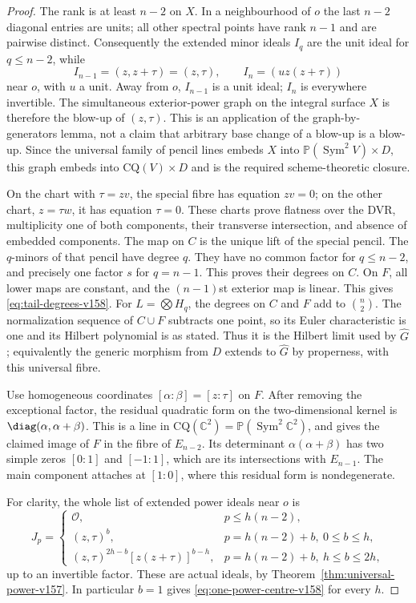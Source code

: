 \documentclass[11pt,reqno]{amsart}
\numberwithin{equation}{section}
\theoremstyle{definition}\newtheorem{definition}[theorem]{Definition}
\theoremstyle{remark}\newtheorem{remark}[theorem]{Remark}
\newcommand{\C}{\mathbb C}\newcommand{\Q}{\mathbb Q}
\newcommand{\Pj}{\mathbb P}\newcommand{\A}{\mathbb A}
\newcommand{\OO}{\mathcal O}\newcommand{\II}{\mathcal I}
\DeclareMathOperator{\Sym}{Sym}\DeclareMathOperator{\Gr}{Gr}
\begin{document}
\begin{proof}
The rank is at least $n-2$ on $X$. In a neighbourhood of $o$ the last
$n-2$ diagonal entries are units; all other spectral points have rank
$n-1$ and are pairwise distinct. Consequently the extended minor ideals
$I_q$ are the unit ideal for $q\leq n-2$, while
\[
 I_{n-1}=(z,z+\tau)=(z,\tau),\qquad
 I_n=(u z(z+\tau))
\]
near $o$, with $u$ a unit. Away from $o$, $I_{n-1}$ is a unit ideal;
$I_n$ is everywhere invertible. The simultaneous exterior-power graph
on the integral surface $X$ is therefore the blow-up of $(z,\tau)$.
This is an application of the graph-by-generators lemma, not a claim
that arbitrary base change of a blow-up is a blow-up. Since the
universal family of pencil lines embeds $X$ into $\Pj(\Sym^2V)\times D$,
this graph embeds into $\mathrm{CQ}(V)\times D$ and is the required
scheme-theoretic closure.

On the chart with $\tau=zv$, the special fibre has equation $zv=0$;
on the other chart, $z=\tau w$, it has equation $\tau=0$.
These charts prove flatness over the DVR, multiplicity one of both
components, their transverse intersection, and absence of embedded
components. The map on $C$ is the unique lift of the special pencil.
The $q$-minors of that pencil have degree $q$. They have no common
factor for $q\leq n-2$, and precisely one factor $s$ for $q=n-1$.
This proves their degrees on $C$. On $F$, all lower maps are constant,
and the $(n-1)$st exterior map is linear. This gives
\eqref{eq:tail-degrees-v158}. For $L=\bigotimes H_q$, the degrees
on $C$ and $F$ add to $\binom n2$. The normalization sequence of
$C\cup F$ subtracts one point, so its Euler characteristic is one
and its Hilbert polynomial is as stated. Thus it is the Hilbert
limit used by $\widehat G$; equivalently the generic morphism from
$D$ extends to $\widehat G$ by properness, with this universal fibre.

Use homogeneous coordinates $[\alpha:\beta]=[z:\tau]$ on $F$.
After removing the exceptional factor, the residual quadratic form
on the two-dimensional kernel is
$\diag(\alpha,\alpha+\beta)$. This is a line in
$\mathrm{CQ}(\C^2)=\Pj(\Sym^2\C^2)$, and gives the claimed image
of $F$ in the fibre of $E_{n-2}$. Its determinant $\alpha(\alpha+\beta)$ has two
simple zeros $[0:1]$ and $[-1:1]$, which are its intersections with
$E_{n-1}$. The main component attaches at $[1:0]$, where this residual
form is nondegenerate.

For clarity, the whole list of extended power ideals near $o$ is
\begin{equation}\label{eq:tail-all-ideals-v158}
 J_p=
 \begin{cases}
 \OO,&p\leq h(n-2),\\
 (z,\tau)^b,&p=h(n-2)+b,\ 0\leq b\leq h,\\
 (z,\tau)^{2h-b}[z(z+\tau)]^{b-h},
       &p=h(n-2)+b,\ h\leq b\leq2h,
 \end{cases}
\end{equation}
up to an invertible factor. These are actual ideals, by
Theorem~\ref{thm:universal-power-v157}. In particular $b=1$ gives
\eqref{eq:one-power-centre-v158} for every $h$.


\end{proof}
\end{document}

